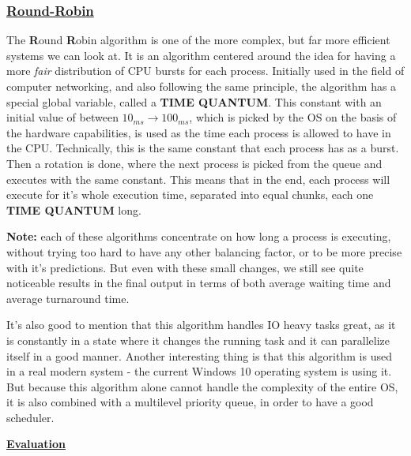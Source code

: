 \documentclass{article}
\begin{document}
\subsubsection{\underline{Round-Robin}}

The \textbf{R}ound \textbf{R}obin algorithm is one of the more complex, but far more efficient systems we can look at. It is an algorithm centered around the idea for having a more \textit{fair} distribution of CPU bursts for each process. Initially used in the field of computer networking, and also following the same principle, the algorithm has a special global variable, called a \textbf{TIME QUANTUM}. This constant with an initial value of between $10_{ms} \to 100_{ms}$, which is picked by the OS on the basis of the hardware capabilities, is used as the time each process is allowed to have in the CPU. Technically, this is the same constant that each process has as a burst. Then a rotation is done, where the next process is picked from the queue and executes with the same constant. This means that in the end, each process will execute for it's whole execution time, separated into equal chunks, each one \textbf{TIME QUANTUM} long.

\textbf{Note:} each of these algorithms concentrate on how long a process is executing, without trying too hard to have any other balancing factor, or to be more precise with it's predictions. But even with these small changes, we still see quite noticeable results in the final output in terms of both average waiting time and average turnaround time.

It's also good to mention that this algorithm handles IO heavy tasks great, as it is constantly in a state where it changes the running task and it can parallelize itself in a good manner. Another interesting thing is that this algorithm is used in a real modern system - the current Windows 10 operating system is using it. But because this algorithm alone cannot handle the complexity of the entire OS, it is also combined with a multilevel priority queue, in order to have a good scheduler.

\bigskip

\underline{\textbf{Evaluation}}
\end{document}
